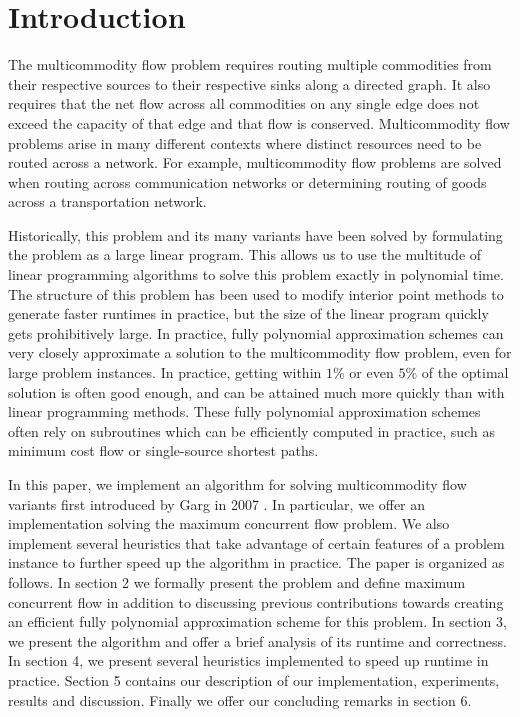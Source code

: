 \section{Introduction}

The multicommodity flow problem requires routing multiple commodities
from their respective sources to their respective sinks along a
directed graph. It also requires that the net flow across all commodities on any
single edge does not exceed the capacity of that edge and that flow is conserved. Multicommodity
flow problems arise in many different contexts where distinct
resources need to be routed across a network. For example,
multicommodity flow problems are solved when routing across
communication networks or determining routing of goods across a transportation network.

Historically, this problem and its many variants have been solved by
formulating the problem as a large linear program. This allows us to
use the multitude of linear programming
algorithms to solve this problem exactly in polynomial time. The
structure of this problem has been used to modify
interior point methods to generate faster runtimes in practice, but
the size of the linear program quickly gets prohibitively large. In
practice, fully polynomial approximation schemes can very closely
approximate a solution to the multicommodity flow problem, even for
large problem instances. In practice, getting within $1\%$ or even
$5\%$ of the optimal solution is often good enough, and can be
attained much more quickly than with linear
programming methods. These fully polynomial approximation schemes
often rely on subroutines which can be efficiently computed in
practice, such as minimum cost flow or single-source shortest paths.

In this paper, we implement an algorithm for solving multicommodity
flow variants first introduced by Garg in 2007 \cite{garg}. 
In particular, we offer
an implementation solving the maximum concurrent flow problem. We also
implement several heuristics that take advantage of certain features
of a problem instance to further speed up the algorithm in
practice. The paper is organized as follows. In section 2
we formally present the problem and define maximum concurrent flow in
addition to discussing previous contributions towards creating an
efficient fully polynomial approximation scheme for this problem. In
section 3, we present the algorithm and offer a brief analysis of its
runtime and correctness. In section 4, we present several heuristics
implemented to speed up runtime in practice. Section 5 contains our
description of our implementation, experiments, results and
discussion.  Finally we offer our concluding remarks in section 6.

